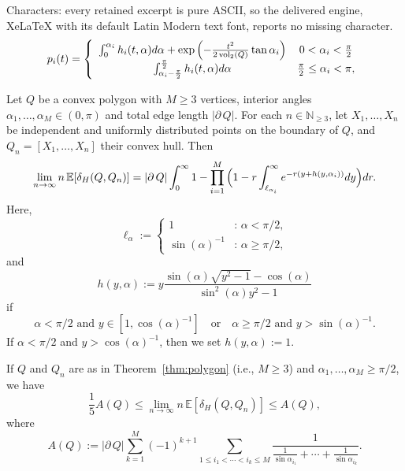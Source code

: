 \documentclass[10pt,a4paper]{amsart}
\newcommand{\IE}{\mathbb{E}}
\newcommand{\IN}{\mathbb{N}}
\newcommand{\dd}{{\rm d}}
\begin{document}
Characters: every retained excerpt is pure ASCII, so the delivered engine, XeLaTeX with its default Latin Modern text font, reports no missing character.
\begin{equation}
 \label{eq:bhb-integral}
p_{i}(t)
=\left\{
\begin{array}{cc}
\int_{0}^{\alpha_{i}}h_{i}(t,\alpha)\dd\alpha+\exp\left(-\frac{t^{2}}{2\operatorname{vol}_{2}(Q)}\tan\alpha_{i}\right) 
& 0<\alpha_{i}<\frac{\pi}{2}
\\
\int_{\alpha_{i}-\frac{\pi}{2}}^{\frac{\pi}{2}}h_{i}(t,\alpha)\dd\alpha
& \frac{\pi}{2}\leq \alpha_{i}<\pi,
\end{array}
\right.
\end{equation}

\begin{theorem} \label{thm:polygon}
Let $Q$ be a convex polygon with $M\ge 3$ vertices, interior angles $\alpha_1,\dots,\alpha_M\in (0,\pi)$ and total edge length  $\left| \partial \, Q \right|$. For each $n\in\IN_{\geq 3}$, let $X_1,\dots,X_n$ be  independent and uniformly distributed points on the boundary of $Q$, and $Q_n=[X_1,\dots,X_n]$ their convex hull. Then
\begin{equation}\label{polygon-1}
\lim_{n\to\infty}n \, \IE[\delta_H(Q,Q_n)]
= \left| \partial \, Q \right| \int_{0}^{\infty}1-\prod_{i=1}^M\Big(1-r\int_{\ell_{\alpha_i}}^{\infty}e^{-r(y+h(y,\alpha_i))}\dd y \Big)\dd r.
\end{equation}
Here,
\begin{equation}\label{polygon-3}
\ell_{\alpha}:=
\begin{cases}
1 &:\,\alpha<\pi/2,\\
\sin(\alpha)^{-1}&:\,\alpha\ge \pi/2,
\end{cases}
\end{equation}
and
\begin{equation}\label{polygon-4}
h(y,\alpha)
:= y\frac{\sin(\alpha)\sqrt{y^2-1}-\cos(\alpha)}{\sin^2(\alpha)y^2-1}
\end{equation}
if
\[
\alpha<\pi/2 \text{ and }y\in [1,\cos(\alpha)^{-1}] \quad\text{or}\quad \alpha\ge \pi/2 \text{ and } y>\sin(\alpha)^{-1}.
\]
If  $\alpha<\pi/2$ and $y>\cos(\alpha)^{-1}$, then we set $h(y,\alpha):=1$.	
\end{theorem}

\begin{corollary}\label{cor:asymptotics}
If $Q$ and $Q_n$ are as in Theorem~\ref{thm:polygon} (i.e., $M\geq 3$) and $\alpha_1,\dots,\alpha_M\ge \pi/2$, we have
\begin{equation*}\label{polygon-5}
\frac{1}{5} A(Q) 
\le \lim_{n\to\infty}n \, \IE[\delta_H(Q,Q_n)]
\le A(Q),
\end{equation*}
where 
\[
A(Q)
:= \left| \partial \, Q \right|\sum_{k=1}^{M}(-1)^{k+1}\sum_{1\leq i_{1}<\cdots< i_{k}\leq M} \frac{1}{\frac{1}{\sin\alpha_{i_{1}}}+\cdots+\frac{1}{\sin\alpha_{i_{k}}}}.
\]
\end{corollary}
\end{document}
